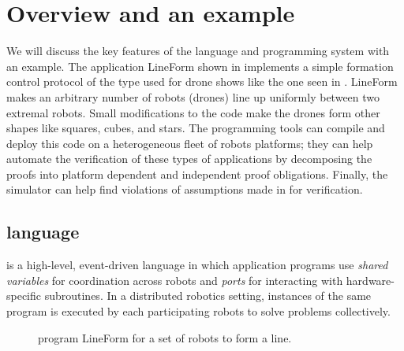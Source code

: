 \section{Overview and an example}
\label{sec:overview}

\newcommand{\LineForm}{\textsf{LineForm}\xspace}

We will discuss the key features of the \lgname language and programming system with an example.
The \lgname application \LineForm shown in  implements a simple formation control protocol of the type  used for drone shows like the one seen in .
\LineForm makes an arbitrary number of robots (drones) line up uniformly between two extremal robots.
Small modifications to the code make the drones form other shapes like squares, cubes, and stars.
The \lgname programming tools can compile and deploy this code on a heterogeneous fleet of robots platforms; they can  help automate the verification of these types of applications by decomposing the proofs into platform dependent and independent proof obligations. Finally, the \lgname simulator can help find violations of assumptions made in for verification.

\subsection{\lgname language}
\label{sec:koord-language}
\lgname is a high-level, event-driven language in which application programs use \emph{shared variables} for coordination across robots
and \emph{ports} for interacting with hardware-specific subroutines.
In a distributed robotics setting, instances of the same \lgname program is executed by each participating robots to solve problems collectively.

\begin{figure}[h!]
    {
        
    }
    {
        
    }
    \caption{\lgname program \LineForm for a set of robots to form a line.}
    \label{fig:lineform}
\end{figure}

